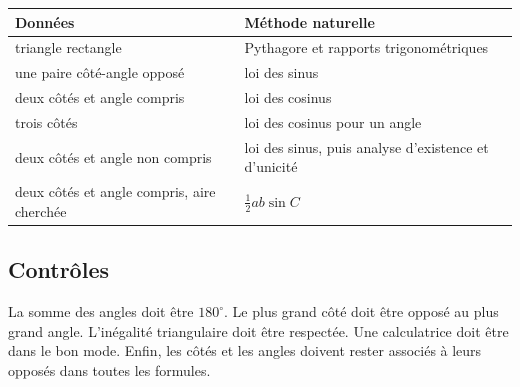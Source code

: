 \begin{center}
\begin{tabularx}{\textwidth}{@{}lY@{}}
\toprule
Données & Méthode naturelle\\\midrule
triangle rectangle & Pythagore et rapports trigonométriques\\
une paire côté-angle opposé & loi des sinus\\
deux côtés et angle compris & loi des cosinus\\
trois côtés & loi des cosinus pour un angle\\
deux côtés et angle non compris & loi des sinus, puis analyse d'existence et d'unicité\\
deux côtés et angle compris, aire cherchée & $\frac12ab\sin C$\\
\bottomrule
\end{tabularx}
\end{center}

\subsection{Contrôles}

La somme des angles doit être $180^\circ$. Le plus grand côté doit être opposé au plus grand angle. L'inégalité triangulaire doit être respectée. Une calculatrice doit être dans le bon mode. Enfin, les côtés et les angles doivent rester associés à leurs opposés dans toutes les formules.
